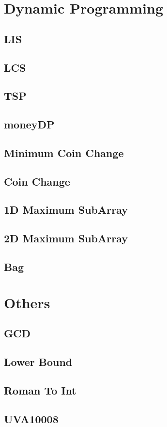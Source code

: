 \section{Dynamic Programming}
\subsection{LIS}

\subsection{LCS}

\subsection{TSP}

\subsection{moneyDP}

\subsection{Minimum Coin Change}

\subsection{Coin Change}

\subsection{1D Maximum SubArray}

\subsection{2D Maximum SubArray}

\subsection{Bag}


\section{Others}
\subsection{GCD}

\subsection{Lower Bound}

\subsection{Roman To Int}

\subsection{UVA10008}
